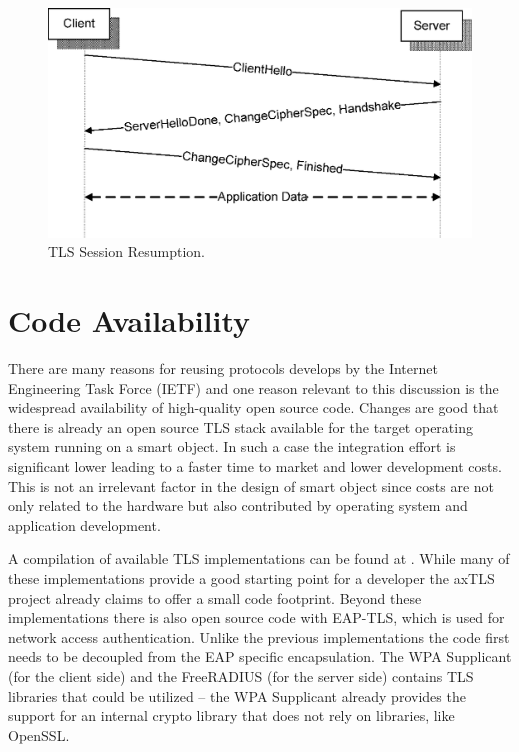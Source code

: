 \documentclass[a4paper, 10pt]{IEEEtran}
\begin{document}
\begin{figure}[!t]
 \centering
 \includegraphics[scale=0.50]{TLS-Session-Resumption}
 \caption{TLS Session Resumption.}
 \label{tls-session-resumption-figure}
\end{figure}

\section{Code Availability}

There are many reasons for reusing protocols develops by the Internet Engineering Task Force (IETF) and one reason relevant to this discussion is the widespread availability of high-quality open source code. Changes are good that there is already an open source TLS stack available for the target operating system running on a smart object. In such a case the integration effort is significant lower leading to a faster time to market and lower development costs. This is not an irrelevant factor in the design of smart object since costs are not only related to the hardware but also contributed by operating system and application development. 

A compilation of available TLS implementations can be found at \cite{TLS-Implementations}. While many of these implementations provide a good starting point for a developer the axTLS project \cite{axTLS} already claims to offer a small code footprint. Beyond these implementations there is also open source code with EAP-TLS, which is used for network access authentication. Unlike the previous implementations the code first needs to be decoupled from the EAP specific encapsulation. The WPA Supplicant \cite{wpa-supplicant} (for the client side) and the FreeRADIUS \cite{FreeRADIUS} (for the server side) contains TLS libraries that could be utilized -- the WPA Supplicant already provides the support for an internal crypto library that does not rely on libraries, like OpenSSL. 
\end{document}
